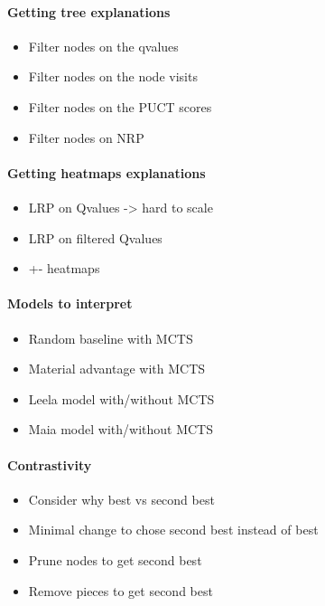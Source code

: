 \paragraph{Getting tree explanations}
\begin{itemize}
    \item Filter nodes on the qvalues
    \item Filter nodes on the node visits
    \item Filter nodes on the PUCT scores
    \item Filter nodes on NRP
\end{itemize}

\paragraph{Getting heatmaps explanations}
\begin{itemize}
    \item LRP on Qvalues -> hard to scale
    \item LRP on filtered Qvalues
    \item +- heatmaps
\end{itemize}

\paragraph{Models to interpret}
\begin{itemize}
    \item Random baseline with MCTS
    \item Material advantage with MCTS
    \item Leela model with/without MCTS
    \item Maia model with/without MCTS
\end{itemize}


\paragraph{Contrastivity}
\begin{itemize}
    \item Consider why best vs second best
    \item Minimal change to chose second best instead of best
    \item Prune nodes to get second best
    \item Remove pieces to get second best
\end{itemize}


